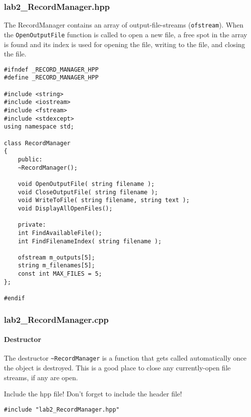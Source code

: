 \documentclass[a4paper,12pt]{book}
\begin{document}
            \subsubsection*{lab2\_RecordManager.hpp}

            The RecordManager contains an array of output-file-streams
            (\texttt{ofstream}). When the \texttt{OpenOutputFile} function
            is called to open a new file, a free spot in the array is found
            and its index is used for opening the file, writing to the
            file, and closing the file.

\begin{lstlisting}[style=code]
#ifndef _RECORD_MANAGER_HPP
#define _RECORD_MANAGER_HPP

#include <string>
#include <iostream>
#include <fstream>
#include <stdexcept>
using namespace std;

class RecordManager
{
    public:
    ~RecordManager();
    
    void OpenOutputFile( string filename );
    void CloseOutputFile( string filename );
    void WriteToFile( string filename, string text );
    void DisplayAllOpenFiles();
    
    private:
    int FindAvailableFile();
    int FindFilenameIndex( string filename );
    
    ofstream m_outputs[5];
    string m_filenames[5];
    const int MAX_FILES = 5;
};

#endif
\end{lstlisting}

            \newpage
            \subsubsection*{lab2\_RecordManager.cpp}

            \paragraph{Destructor}
            The destructor \texttt{\textasciitilde RecordManager} is
            a function that gets called automatically once the object
            is destroyed. This is a good place to close any currently-open
            file streams, if any are open.

            \begin{hint}{Include the hpp file!}
                Don't forget to include the header file!
\begin{verbatim}
#include "lab2_RecordManager.hpp"
\end{verbatim}
            \end{hint}
            
\end{document}
